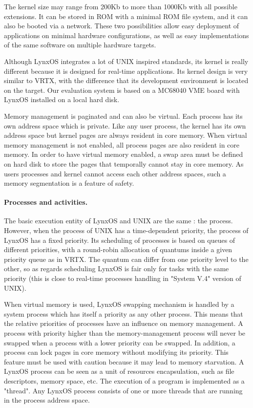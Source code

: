 \documentclass[10pt]{report}
\begin{document}
The kernel size may range from 200Kb to more than 1000Kb with all
possible extensions. It can be stored in ROM with a minimal ROM
file system, and it can also be booted via a network. These two
possibilities allow easy deployment of applications on minimal
hardware configurations, as well as easy implementations of the
same software on multiple hardware targets.

Although LynxOS integrates a lot of UNIX inspired standards, its
kernel is really different because it is designed for real-time
applications. Its kernel design is very similar to VRTX, with the
difference that its development environment is located on the
target. Our evaluation system is based on a MC68040 VME board
with LynxOS installed on a local hard disk.

Memory management is paginated and can also be virtual. Each
process has its own address space which is private. Like any user
process, the kernel has its own address space but kernel pages
are always resident in core memory. When virtual memory
management is not enabled, all process pages are also resident in
core memory. In order to have virtual memory enabled, a swap area
must be defined on hard disk to store the pages that temporally
cannot stay in core memory. As users processes and kernel cannot
access each other address spaces, such a memory segmentation is a
feature of safety.


\paragraph{Processes and activities.} The basic execution entity of LynxOS and UNIX are the same : the process. However, when
the process of UNIX has a time-dependent priority, the process of LynxOS has a fixed priority. Its scheduling of processes is
based on queues of different priorities, with a round-robin allocation of quantums inside a given priority queue as in VRTX.
The quantum can differ from one priority level to the other, so as regards scheduling LynxOS is fair only for tasks with the same
priority (this is close to real-time processes handling in "System V.4" version of UNIX).

When virtual memory is used, LynxOS swapping mechanism is handled by a system process which has itself a priority
as any other process. This means that the relative priorities of processes have an influence on memory management. A process with
priority higher than the memory-management process will never be swapped when a process with a lower priority can be swapped.
In addition, a process can lock pages in core memory without modifying its priority. This feature must be used with
caution because it may lead to memory starvation. A LynxOS process can be seen as a unit of resources encapsulation, such
as file descriptors, memory space, etc. The execution of a program is implemented as a "thread". Any LynxOS process consists of
one or more threads that are running in the process address space.
\end{document}
